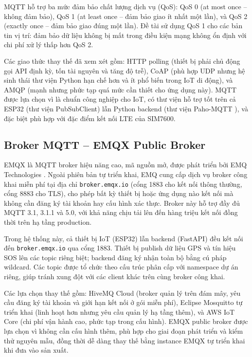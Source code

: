 \documentclass[../DoAn.tex]{subfiles}
\begin{document}
MQTT hỗ trợ ba mức đảm bảo chất lượng dịch vụ (QoS): QoS 0 (at most once – không đảm bảo), QoS 1 (at least once – đảm bảo giao ít nhất một lần), và QoS 2 (exactly once – đảm bảo giao đúng một lần). Đề tài sử dụng QoS 1 cho các bản tin vị trí: đảm bảo dữ liệu không bị mất trong điều kiện mạng không ổn định với chi phí xử lý thấp hơn QoS 2.

Các giao thức thay thế đã xem xét gồm: HTTP polling (thiết bị phải chủ động gọi API định kỳ, tốn tài nguyên và tăng độ trễ), CoAP (phù hợp UDP nhưng hệ sinh thái thư viện Python hạn chế hơn và ít phổ biến trong IoT di động), và AMQP (mạnh nhưng phức tạp quá mức cần thiết cho ứng dụng này). MQTT được lựa chọn vì là chuẩn công nghiệp cho IoT, có thư viện hỗ trợ tốt trên cả ESP32 (thư viện PubSubClient) lẫn Python backend (thư viện Paho-MQTT \cite{paho_mqtt}), và đặc biệt phù hợp với đặc điểm kết nối LTE của SIM7600.

\subsection{Broker MQTT – EMQX Public Broker}
\label{subsection:3.2.2}

EMQX là MQTT broker hiệu năng cao, mã nguồn mở, được phát triển bởi EMQ Technologies \cite{emqx_broker}. Ngoài phiên bản tự triển khai, EMQ cung cấp dịch vụ broker công khai miễn phí tại địa chỉ \texttt{broker.emqx.io} (cổng 1883 cho kết nối thông thường, cổng 8883 cho TLS), cho phép bất kỳ thiết bị hoặc ứng dụng nào kết nối mà không cần đăng ký tài khoản hay cấu hình xác thực. Broker này hỗ trợ đầy đủ MQTT 3.1, 3.1.1 và 5.0, với khả năng chịu tải lên đến hàng triệu kết nối đồng thời trên hạ tầng production.

Trong hệ thống này, cả thiết bị IoT (ESP32) lẫn backend (FastAPI) đều kết nối đến \texttt{broker.emqx.io} qua cổng 1883. Thiết bị publish dữ liệu GPS và tín hiệu SOS lên các topic riêng biệt; backend đăng ký nhận toàn bộ bằng cú pháp wildcard. Các topic được tổ chức theo cấu trúc phân cấp với namespace dự án riêng, giúp tránh xung đột với các client khác trên cùng broker công khai.

Các lựa chọn thay thế gồm: HiveMQ Cloud (broker quản lý trên đám mây, yêu cầu đăng ký tài khoản và giới hạn kết nối ở gói miễn phí), Eclipse Mosquitto tự triển khai (linh hoạt hơn nhưng yêu cầu quản lý hạ tầng thêm), và AWS IoT Core (chi phí vận hành cao, phức tạp trong cấu hình). EMQX public broker được lựa chọn vì không cần cấu hình thêm, phù hợp cho giai đoạn phát triển và kiểm thử nguyên mẫu, đồng thời dễ dàng thay thế bằng instance EMQX tự triển khai khi đưa vào sản xuất.
\end{document}
